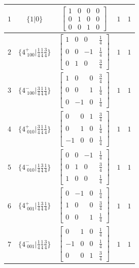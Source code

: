 \documentclass[fleqn,8pt]{jsarticle}
\begin{document}
\begin{longtable}{ccccc}
$ 1 $ & $ \{1|0\} $ & $ \begin{bmatrix} 1 & 0 & 0 & 0 \\ 0 & 1 & 0 & 0 \\ 0 & 0 & 1 & 0 \end{bmatrix} $ & $ 1 $ & $ 1 $ \\ \hline
$ 2 $ & $ \{4^{+}_{\,\,100}|\frac{1}{4} \frac{1}{4} \frac{3}{4}\} $ & $ \begin{bmatrix} 1 & 0 & 0 & \frac{1}{4} \\ 0 & 0 & -1 & \frac{1}{4} \\ 0 & 1 & 0 & \frac{3}{4} \end{bmatrix} $ & $ 1 $ & $ 1 $ \\ \hline
$ 3 $ & $ \{4^{-}_{\,\,100}|\frac{3}{4} \frac{1}{4} \frac{1}{4}\} $ & $ \begin{bmatrix} 1 & 0 & 0 & \frac{3}{4} \\ 0 & 0 & 1 & \frac{1}{4} \\ 0 & -1 & 0 & \frac{1}{4} \end{bmatrix} $ & $ 1 $ & $ 1 $ \\ \hline
$ 4 $ & $ \{4^{+}_{\,\,010}|\frac{3}{4} \frac{1}{4} \frac{1}{4}\} $ & $ \begin{bmatrix} 0 & 0 & 1 & \frac{3}{4} \\ 0 & 1 & 0 & \frac{1}{4} \\ -1 & 0 & 0 & \frac{1}{4} \end{bmatrix} $ & $ 1 $ & $ 1 $ \\ \hline
$ 5 $ & $ \{4^{-}_{\,\,010}|\frac{1}{4} \frac{3}{4} \frac{1}{4}\} $ & $ \begin{bmatrix} 0 & 0 & -1 & \frac{1}{4} \\ 0 & 1 & 0 & \frac{3}{4} \\ 1 & 0 & 0 & \frac{1}{4} \end{bmatrix} $ & $ 1 $ & $ 1 $ \\ \hline
$ 6 $ & $ \{4^{+}_{\,\,001}|\frac{1}{4} \frac{3}{4} \frac{1}{4}\} $ & $ \begin{bmatrix} 0 & -1 & 0 & \frac{1}{4} \\ 1 & 0 & 0 & \frac{3}{4} \\ 0 & 0 & 1 & \frac{1}{4} \end{bmatrix} $ & $ 1 $ & $ 1 $ \\ \hline
$ 7 $ & $ \{4^{-}_{\,\,001}|\frac{1}{4} \frac{1}{4} \frac{3}{4}\} $ & $ \begin{bmatrix} 0 & 1 & 0 & \frac{1}{4} \\ -1 & 0 & 0 & \frac{1}{4} \\ 0 & 0 & 1 & \frac{3}{4} \end{bmatrix} $ & $ 1 $ & $ 1 $ \\ \hline

\end{longtable}
\end{document}
